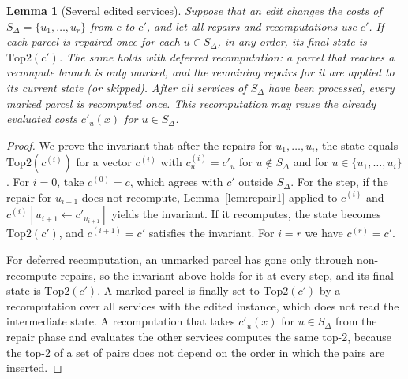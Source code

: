 \documentclass[11pt]{article}
\newtheorem{lemma}[theorem]{Lemma}
\theoremstyle{definition}
\theoremstyle{remark}
\begin{document}
\begin{lemma}[Several edited services]\label{lem:compose}
Suppose that an edit changes the costs of $S_\Delta=\{u_1,\dots,u_r\}$ from $c$ to $c'$, and let all repairs and recomputations use $c'$. If each parcel is repaired once for
each $u\in S_\Delta$, in any order, its final state is $\mathrm{Top2}(c')$. The same holds with
\emph{deferred recomputation}: a parcel that reaches a recompute branch is only marked, and
the remaining repairs for it are applied to its current state (or skipped). After all
services of $S_\Delta$ have been processed, every marked parcel is recomputed once. This
recomputation may reuse the already evaluated costs $c'_u(x)$ for $u\in S_\Delta$.
\end{lemma}
\begin{proof}
We prove the invariant that after the repairs for $u_1,\dots,u_i$, the state equals
$\mathrm{Top2}(c^{(i)})$ for a vector $c^{(i)}$ with $c^{(i)}_u=c'_u$ for $u\notin S_\Delta$ and for
$u\in\{u_1,\dots,u_i\}$. For $i=0$, take $c^{(0)}=c$, which agrees with $c'$ outside $S_\Delta$.
For the step, if the repair for $u_{i+1}$ does not recompute, Lemma~\ref{lem:repair1}
applied to $c^{(i)}$ and $c^{(i)}[u_{i+1}\leftarrow c'_{u_{i+1}}]$ yields the invariant. If it
recomputes, the state becomes $\mathrm{Top2}(c')$, and $c^{(i+1)}=c'$ satisfies the
invariant. For $i=r$ we have $c^{(r)}=c'$.

For deferred recomputation, an unmarked parcel has gone only through non-recompute
repairs, so the invariant above holds for it at every step, and its final state is
$\mathrm{Top2}(c')$. A marked parcel is finally set to $\mathrm{Top2}(c')$ by a recomputation
over all services with the edited instance, which does not read the intermediate state. A
recomputation that takes $c'_u(x)$ for $u\in S_\Delta$ from the repair phase and evaluates the
other services computes the same top-2, because the top-2 of a set of pairs does not
depend on the order in which the pairs are inserted.
\end{proof}
\end{document}
